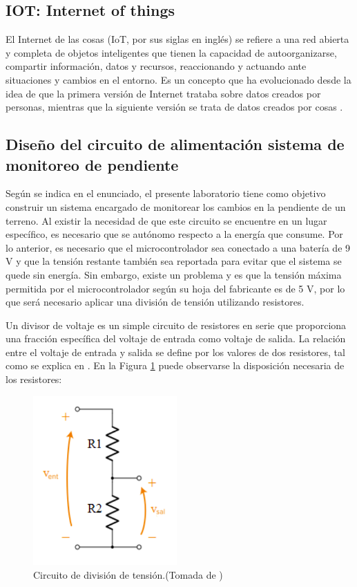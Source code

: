 \subsection{IOT: Internet of things}
El Internet de las cosas (IoT, por sus siglas en inglés) se refiere a una red abierta y completa de objetos inteligentes que tienen la capacidad de autoorganizarse, compartir información, datos y recursos, reaccionando y actuando ante situaciones y cambios en el entorno. Es un concepto que ha evolucionado desde la idea de que la primera versión de Internet trataba sobre datos creados por personas, mientras que la siguiente versión se trata de datos creados por cosas \cite{madakam2015internet}. 

\subsection{Diseño del circuito de alimentación sistema de monitoreo de pendiente} \label{sec:cir1}

Según se indica en el enunciado, el presente laboratorio tiene como objetivo construir un sistema encargado de monitorear los cambios en la pendiente de un terreno. Al existir la necesidad de que este circuito se encuentre en un lugar específico, es necesario que se autónomo respecto a la energía que consume. Por lo anterior, es necesario que el microcontrolador sea conectado a una batería de 9 V y que la tensión restante también sea reportada para evitar que el sistema se quede sin energía. Sin embargo, existe un problema y es que la tensión máxima permitida por el microcontrolador según su hoja del fabricante \cite{ST} es de 5 V, por lo que será necesario aplicar una división de tensión utilizando resistores.

Un divisor de voltaje es un simple circuito de resistores en serie que proporciona una fracción específica del voltaje de entrada como voltaje de salida. La relación entre el voltaje de entrada y salida se define por los valores de dos resistores, tal como se explica en \cite{DT}. En la Figura \ref{fig:DTD} puede observarse la disposición necesaria de los resistores:

\begin{figure}[H]
\centering
\includegraphics[width=55mm]{./Figuras/Nota_teorica/DTD}
\caption{Circuito de división de tensión.(Tomada de \cite{DT})}
\label{fig:DTD}
\end{figure}

